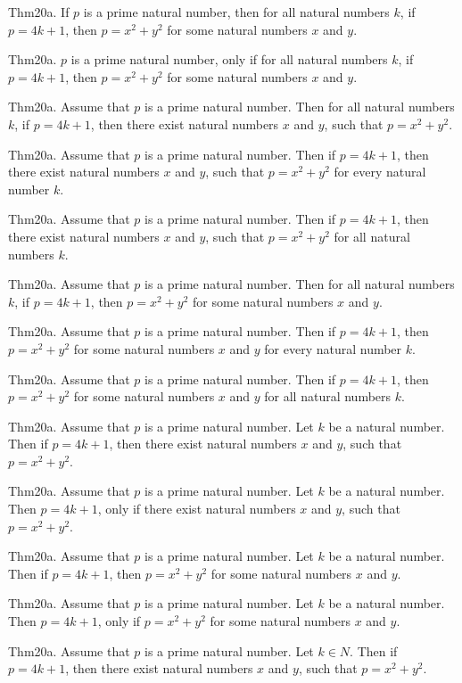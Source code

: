\documentclass{article}
\begin{document}
Thm20a. If $p$ is a prime natural number, then for all natural numbers $k$, if $p = 4 k + 1$, then $p = x ^{ 2}+ y ^{ 2}$ for some natural numbers $x$ and $y$.

Thm20a. $p$ is a prime natural number, only if for all natural numbers $k$, if $p = 4 k + 1$, then $p = x ^{ 2}+ y ^{ 2}$ for some natural numbers $x$ and $y$.

Thm20a. Assume that $p$ is a prime natural number. Then for all natural numbers $k$, if $p = 4 k + 1$, then there exist natural numbers $x$ and $y$, such that $p = x ^{ 2}+ y ^{ 2}$.

Thm20a. Assume that $p$ is a prime natural number. Then if $p = 4 k + 1$, then there exist natural numbers $x$ and $y$, such that $p = x ^{ 2}+ y ^{ 2}$ for every natural number $k$.

Thm20a. Assume that $p$ is a prime natural number. Then if $p = 4 k + 1$, then there exist natural numbers $x$ and $y$, such that $p = x ^{ 2}+ y ^{ 2}$ for all natural numbers $k$.

Thm20a. Assume that $p$ is a prime natural number. Then for all natural numbers $k$, if $p = 4 k + 1$, then $p = x ^{ 2}+ y ^{ 2}$ for some natural numbers $x$ and $y$.

Thm20a. Assume that $p$ is a prime natural number. Then if $p = 4 k + 1$, then $p = x ^{ 2}+ y ^{ 2}$ for some natural numbers $x$ and $y$ for every natural number $k$.

Thm20a. Assume that $p$ is a prime natural number. Then if $p = 4 k + 1$, then $p = x ^{ 2}+ y ^{ 2}$ for some natural numbers $x$ and $y$ for all natural numbers $k$.

Thm20a. Assume that $p$ is a prime natural number. Let $k$ be a natural number. Then if $p = 4 k + 1$, then there exist natural numbers $x$ and $y$, such that $p = x ^{ 2}+ y ^{ 2}$.

Thm20a. Assume that $p$ is a prime natural number. Let $k$ be a natural number. Then $p = 4 k + 1$, only if there exist natural numbers $x$ and $y$, such that $p = x ^{ 2}+ y ^{ 2}$.

Thm20a. Assume that $p$ is a prime natural number. Let $k$ be a natural number. Then if $p = 4 k + 1$, then $p = x ^{ 2}+ y ^{ 2}$ for some natural numbers $x$ and $y$.

Thm20a. Assume that $p$ is a prime natural number. Let $k$ be a natural number. Then $p = 4 k + 1$, only if $p = x ^{ 2}+ y ^{ 2}$ for some natural numbers $x$ and $y$.

Thm20a. Assume that $p$ is a prime natural number. Let $k \in N$. Then if $p = 4 k + 1$, then there exist natural numbers $x$ and $y$, such that $p = x ^{ 2}+ y ^{ 2}$.
\end{document}
